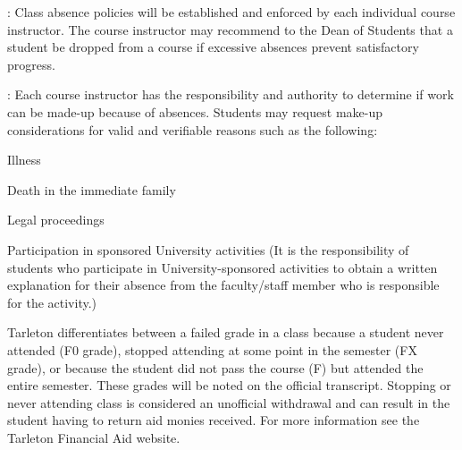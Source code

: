 \documentclass[letterpaper]{article}
\begin{document}
:  Class absence policies will be established and enforced by each individual course instructor.  The course instructor may recommend to the Dean of Students that a student be dropped from a course if excessive absences prevent satisfactory progress.

:  Each course instructor has the responsibility and authority to determine if work can be made-up because of absences.  Students may request make-up considerations for valid and verifiable reasons such as the following:
\bit
\item Illness
\item Death in the immediate family
\item Legal proceedings
\item Participation in sponsored University activities (It is the responsibility of students who participate in University-sponsored activities to obtain a written explanation for their absence from the faculty/staff member who is responsible for the activity.)
\eit


 Tarleton differentiates between a failed grade in a class because a student never attended (F0 grade), stopped attending at some point in the semester (FX grade), or because the student did not pass the course (F) but attended the entire semester. These grades will be noted on the official transcript. Stopping or never attending class is considered an unofficial withdrawal and can result in the student having to return aid monies received.  For more information see the Tarleton Financial Aid website.


\end{document}

